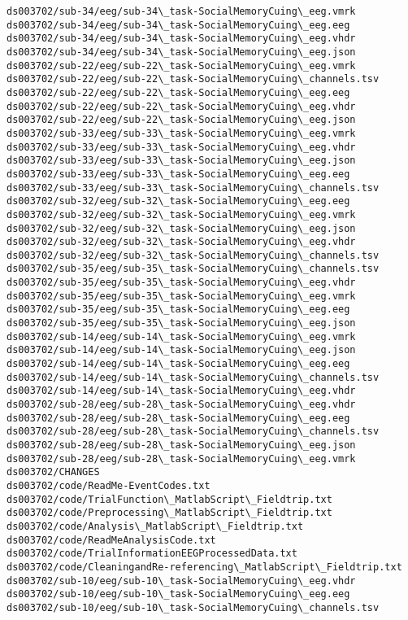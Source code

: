 \documentclass[11pt]{article}
\begin{document}
\begin{Verbatim}[commandchars=\\\{\}]
ds003702/sub-34/eeg/sub-34\_task-SocialMemoryCuing\_eeg.vmrk
ds003702/sub-34/eeg/sub-34\_task-SocialMemoryCuing\_eeg.eeg
ds003702/sub-34/eeg/sub-34\_task-SocialMemoryCuing\_eeg.vhdr
ds003702/sub-34/eeg/sub-34\_task-SocialMemoryCuing\_eeg.json
ds003702/sub-22/eeg/sub-22\_task-SocialMemoryCuing\_eeg.vmrk
ds003702/sub-22/eeg/sub-22\_task-SocialMemoryCuing\_channels.tsv
ds003702/sub-22/eeg/sub-22\_task-SocialMemoryCuing\_eeg.eeg
ds003702/sub-22/eeg/sub-22\_task-SocialMemoryCuing\_eeg.vhdr
ds003702/sub-22/eeg/sub-22\_task-SocialMemoryCuing\_eeg.json
ds003702/sub-33/eeg/sub-33\_task-SocialMemoryCuing\_eeg.vmrk
ds003702/sub-33/eeg/sub-33\_task-SocialMemoryCuing\_eeg.vhdr
ds003702/sub-33/eeg/sub-33\_task-SocialMemoryCuing\_eeg.json
ds003702/sub-33/eeg/sub-33\_task-SocialMemoryCuing\_eeg.eeg
ds003702/sub-33/eeg/sub-33\_task-SocialMemoryCuing\_channels.tsv
ds003702/sub-32/eeg/sub-32\_task-SocialMemoryCuing\_eeg.eeg
ds003702/sub-32/eeg/sub-32\_task-SocialMemoryCuing\_eeg.vmrk
ds003702/sub-32/eeg/sub-32\_task-SocialMemoryCuing\_eeg.json
ds003702/sub-32/eeg/sub-32\_task-SocialMemoryCuing\_eeg.vhdr
ds003702/sub-32/eeg/sub-32\_task-SocialMemoryCuing\_channels.tsv
ds003702/sub-35/eeg/sub-35\_task-SocialMemoryCuing\_channels.tsv
ds003702/sub-35/eeg/sub-35\_task-SocialMemoryCuing\_eeg.vhdr
ds003702/sub-35/eeg/sub-35\_task-SocialMemoryCuing\_eeg.vmrk
ds003702/sub-35/eeg/sub-35\_task-SocialMemoryCuing\_eeg.eeg
ds003702/sub-35/eeg/sub-35\_task-SocialMemoryCuing\_eeg.json
ds003702/sub-14/eeg/sub-14\_task-SocialMemoryCuing\_eeg.vmrk
ds003702/sub-14/eeg/sub-14\_task-SocialMemoryCuing\_eeg.json
ds003702/sub-14/eeg/sub-14\_task-SocialMemoryCuing\_eeg.eeg
ds003702/sub-14/eeg/sub-14\_task-SocialMemoryCuing\_channels.tsv
ds003702/sub-14/eeg/sub-14\_task-SocialMemoryCuing\_eeg.vhdr
ds003702/sub-28/eeg/sub-28\_task-SocialMemoryCuing\_eeg.vhdr
ds003702/sub-28/eeg/sub-28\_task-SocialMemoryCuing\_eeg.eeg
ds003702/sub-28/eeg/sub-28\_task-SocialMemoryCuing\_channels.tsv
ds003702/sub-28/eeg/sub-28\_task-SocialMemoryCuing\_eeg.json
ds003702/sub-28/eeg/sub-28\_task-SocialMemoryCuing\_eeg.vmrk
ds003702/CHANGES
ds003702/code/ReadMe-EventCodes.txt
ds003702/code/TrialFunction\_MatlabScript\_Fieldtrip.txt
ds003702/code/Preprocessing\_MatlabScript\_Fieldtrip.txt
ds003702/code/Analysis\_MatlabScript\_Fieldtrip.txt
ds003702/code/ReadMeAnalysisCode.txt
ds003702/code/TrialInformationEEGProcessedData.txt
ds003702/code/CleaningandRe-referencing\_MatlabScript\_Fieldtrip.txt
ds003702/sub-10/eeg/sub-10\_task-SocialMemoryCuing\_eeg.vhdr
ds003702/sub-10/eeg/sub-10\_task-SocialMemoryCuing\_eeg.eeg
ds003702/sub-10/eeg/sub-10\_task-SocialMemoryCuing\_channels.tsv

\end{Verbatim}
\end{document}
